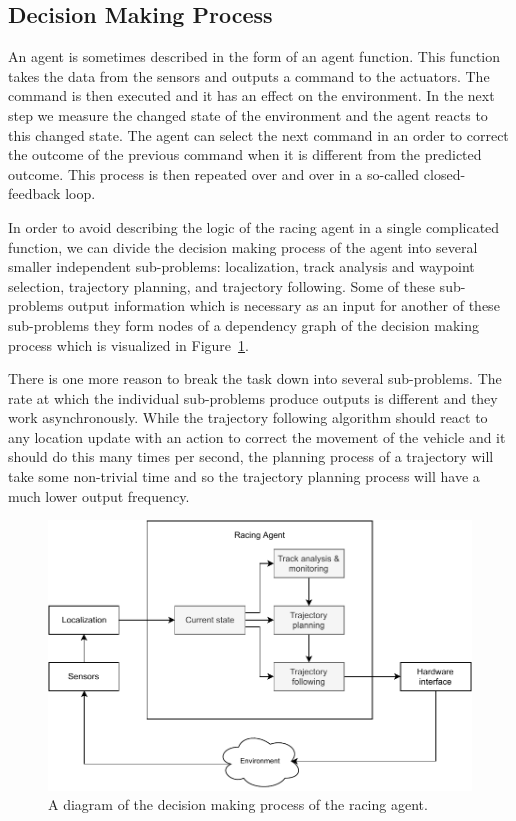 \subsection{Decision Making Process}

An agent is sometimes described in the form of an agent function. This function takes the data from the sensors and outputs a command to the actuators. The command is then executed and it has an effect on the environment. In the next step we measure the changed state of the environment and the agent reacts to this changed state. The agent can select the next command in an order to correct the outcome of the previous command when it is different from the predicted outcome. This process is then repeated over and over in a so-called closed-feedback loop.

In order to avoid describing the logic of the racing agent in a single complicated function, we can divide the decision making process of the agent into several smaller independent sub-problems: localization, track analysis and waypoint selection, trajectory planning, and trajectory following. Some of these sub-problems output information which is necessary as an input for another of these sub-problems they form nodes of a dependency graph of the decision making process which is visualized in Figure~\ref{fig:racing_agent_diagram}.

There is one more reason to break the task down into several sub-problems. The rate at which the individual sub-problems produce outputs is different and they work asynchronously. While the trajectory following algorithm should react to any location update with an action to correct the movement of the vehicle and it should do this many times per second, the planning process of a trajectory will take some non-trivial time and so the trajectory planning process will have a much lower output frequency.

\begin{figure}[b]\centering
	\includegraphics[width=125mm]{../img/racing_agent_diagram.pdf}
	\caption{A diagram of the decision making process of the racing agent.}
	\label{fig:racing_agent_diagram}
\end{figure}

